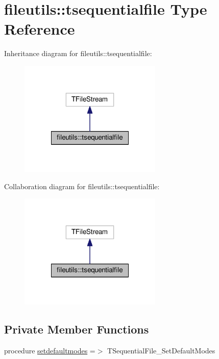 \hypertarget{structfileutils_1_1tsequentialfile}{}\section{fileutils\+:\+:tsequentialfile Type Reference}
\label{structfileutils_1_1tsequentialfile}


Inheritance diagram for fileutils\+:\+:tsequentialfile\+:
\nopagebreak
\begin{figure}[H]
\begin{center}
\leavevmode
\includegraphics[width=192pt]{structfileutils_1_1tsequentialfile__inherit__graph}
\end{center}
\end{figure}


Collaboration diagram for fileutils\+:\+:tsequentialfile\+:
\nopagebreak
\begin{figure}[H]
\begin{center}
\leavevmode
\includegraphics[width=192pt]{structfileutils_1_1tsequentialfile__coll__graph}
\end{center}
\end{figure}
\subsection*{Private Member Functions}
\begin{DoxyCompactItemize}
\item 
procedure \mbox{\hyperlink{structfileutils_1_1tsequentialfile_abbadf70c5d0e8957c0cc4dbf3b463c67}{setdefaultmodes}} =$>$ T\+Sequential\+File\+\_\+\+Set\+Default\+Modes
\end{DoxyCompactItemize}



